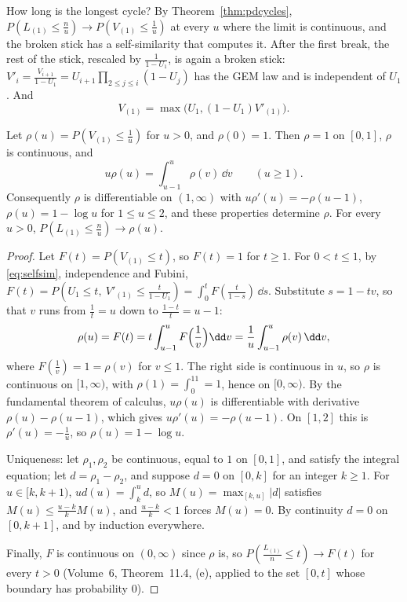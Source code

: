 How long is the longest cycle? By Theorem~\ref{thm:pdcycles}, $P(L_{(1)}\le\frac nu)\to P(V_{(1)}\le\frac1u)$ at every $u$ where the limit is continuous, and the broken stick has a self-similarity that computes it. After the first break, the rest of the stick, rescaled by $\frac1{1-U_1}$,
is again a broken stick: $V'_i=\frac{V_{i+1}}{1-U_1}=U_{i+1}\prod_{2\le j\le i}(1-U_j)$ has the GEM law and is independent of $U_1$. And
\begin{equation}\label{eq:selfsim}
V_{(1)}=\max\bigl(U_1,(1-U_1)V'_{(1)}\bigr).
\end{equation}

\begin{theorem}\label{thm:dickman}
Let $\rho(u)=P(V_{(1)}\le\frac1u)$ for $u>0$, and $\rho(0)=1$. Then $\rho=1$ on $[0,1]$, $\rho$ is continuous, and
\[
u\rho(u)=\int_{u-1}^u\rho(v)\,\dd v\qquad(u\ge1).
\]
Consequently $\rho$ is differentiable on $(1,\infty)$ with $u\rho'(u)=-\rho(u-1)$, $\rho(u)=1-\log u$ for $1\le u\le2$, and these properties determine $\rho$. For every $u>0$, $P(L_{(1)}\le\frac nu)\to\rho(u)$.
\end{theorem}
\begin{proof}
Let $F(t)=P(V_{(1)}\le t)$, so $F(t)=1$ for $t\ge1$. For $0<t\le1$, by \eqref{eq:selfsim}, independence and Fubini, $F(t)=P(U_1\le t,\ V'_{(1)}\le\frac t{1-U_1})=\int_0^tF(\frac t{1-s})\,\dd s$. Substitute $s=1-tv$, so that $v$ runs from $\frac1t=u$ down to
$\frac{1-t}t=u-1$:
\[
\rho(u)=F(t)=t\int_{u-1}^uF\Bigl(\frac1v\Bigr)\dd v=\frac1u\int_{u-1}^u\rho(v)\,\dd v,
\]
where $F(\frac1v)=1=\rho(v)$ for $v\le1$. The right side is continuous in $u$, so $\rho$ is continuous on $[1,\infty)$, with $\rho(1)=\int_0^11=1$, hence on $[0,\infty)$. By the fundamental theorem of calculus, $u\rho(u)$ is differentiable with derivative
$\rho(u)-\rho(u-1)$, which gives $u\rho'(u)=-\rho(u-1)$. On $[1,2]$ this is $\rho'(u)=-\frac1u$, so $\rho(u)=1-\log u$.

Uniqueness: let $\rho_1,\rho_2$ be continuous, equal to $1$ on $[0,1]$, and satisfy the integral equation; let $d=\rho_1-\rho_2$, and suppose $d=0$ on $[0,k]$ for an integer $k\ge1$. For $u\in[k,k+1)$, $ud(u)=\int_k^ud$, so $M(u)=\max_{[k,u]}|d|$ satisfies $M(u)\le\frac{u-k}kM(u)$, and $\frac{u-k}k<1$ forces
$M(u)=0$. By continuity $d=0$ on $[0,k+1]$, and by induction everywhere.

Finally, $F$ is continuous on $(0,\infty)$ since $\rho$ is, so $P(\frac{L_{(1)}}n\le t)\to F(t)$ for every $t>0$ (Volume~6, Theorem~11.4, (e), applied to the set $[0,t]$ whose boundary has probability $0$).
\end{proof}

